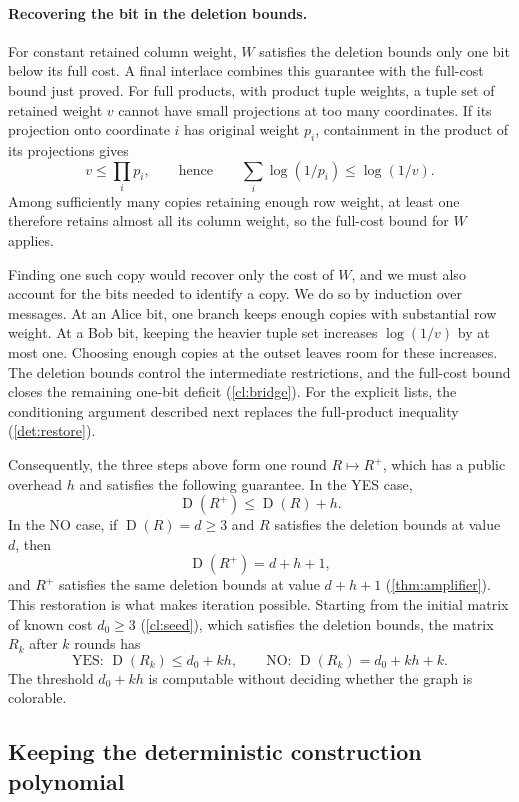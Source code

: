 \documentclass[11pt,letterpaper]{article} \usepackage[utf8]{inputenc}
\theoremstyle{plain} \newtheorem{theorem}{Theorem}[section]
\theoremstyle{definition} \newaliascnt{definition}{theorem}
\newcommand{\D}{\operatorname{D}}
\begin{document}
\paragraph{Recovering the bit in the deletion bounds.}
For constant retained column weight, $W$ satisfies the deletion bounds
only one bit below its full cost. A final
interlace combines this guarantee with the full-cost bound just proved.
For full products, with product tuple weights, a tuple set of retained weight $v$ cannot have small
projections at too many coordinates. If its projection onto coordinate
$i$ has original weight $p_i$, containment in the product of its
projections gives
\[
v\le\prod_i p_i,
\qquad\text{hence}\qquad
\sum_i\log(1/p_i)\le\log(1/v).
\]
Among sufficiently many copies retaining enough row weight, at least
one therefore retains almost all its column weight, so the full-cost
bound for $W$ applies.

Finding one such copy would recover only the cost of $W$, and we must
also account for the bits needed to identify a copy. We do so by
induction over messages. At an Alice bit, one branch keeps enough
copies with substantial row weight. At a Bob bit, keeping the heavier
tuple set increases $\log(1/v)$ by at most one. Choosing enough copies
at the outset leaves room for these increases. The deletion bounds control
the intermediate restrictions, and the full-cost bound closes the
remaining one-bit deficit (\cref{cl:bridge}). For the explicit lists,
the conditioning argument described next replaces the full-product
inequality (\cref{det:restore}).

Consequently, the three steps above form one round $R\mapsto R^+$, which
has a public overhead $h$ and satisfies
the following guarantee. In the YES case,
\[
\D(R^+)\le\D(R)+h.
\]
In the NO case, if $\D(R)=d\ge3$ and $R$ satisfies the deletion bounds
at value $d$, then
\[
\D(R^+)=d+h+1,
\]
and $R^+$ satisfies the same deletion bounds at value $d+h+1$
(\cref{thm:amplifier}). This restoration is what makes iteration
possible. Starting from the initial matrix of known cost $d_0\ge3$
(\cref{cl:seed}), which satisfies the deletion bounds, the matrix $R_k$
after $k$ rounds has
\[
\text{YES: }\D(R_k)\le d_0+kh,
\qquad
\text{NO: }\D(R_k)=d_0+kh+k.
\]
The threshold $d_0+kh$ is computable without deciding whether the graph
is colorable.

\subsection{Keeping the deterministic construction polynomial}
\end{document}
